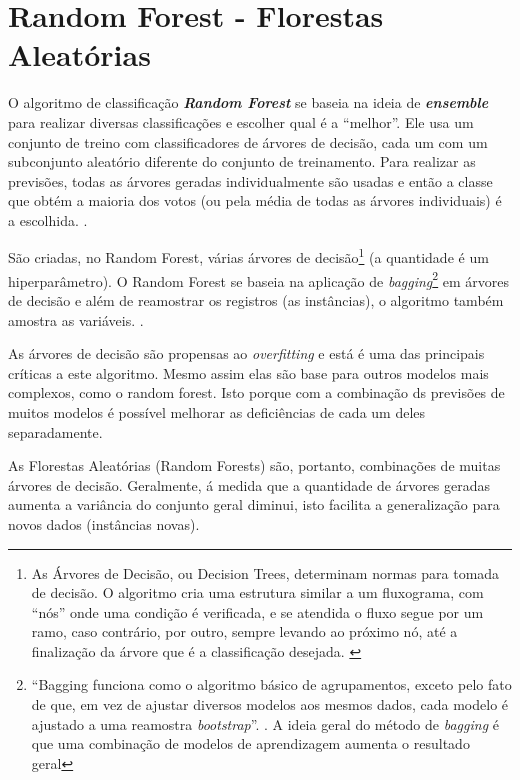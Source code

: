 \section{Random Forest - Florestas Aleatórias}\label{random-forest}
O algoritmo de classificação \textbf{\textit{Random Forest}} se baseia na ideia de \textit{\textbf{ensemble}} para realizar diversas classificações e escolher qual é a ``melhor''. Ele usa um conjunto de treino com classificadores de árvores de decisão, cada um com um subconjunto aleatório diferente do conjunto de treinamento. Para realizar as previsões, todas as árvores geradas individualmente são usadas e então a classe que obtém a maioria dos votos (ou pela média de todas as árvores individuais) é a escolhida. \cite{alpaydin_introduction_2014} \cite{bruce_estatistica_2019} \cite{geron_maos_2020}.

São criadas, no Random Forest, várias árvores de decisão\footnote{As Árvores de Decisão, ou Decision Trees, determinam normas para tomada de decisão. O algoritmo cria uma estrutura similar a um fluxograma, com ``nós'' onde uma condição é verificada, e se atendida o fluxo segue por um ramo, caso contrário, por outro, sempre levando ao próximo nó, até a finalização da árvore que é a classificação desejada. \cite{classification2013}} (a quantidade é um hiperparâmetro). O Random Forest se baseia na aplicação de \textit{bagging}\footnote{``Bagging funciona como o algoritmo básico de agrupamentos, exceto pelo fato de que, em vez de ajustar diversos modelos aos mesmos dados, cada modelo é ajustado a uma reamostra \textit{bootstrap}''. \cite[p.237]{bruce_estatistica_2019}. A ideia geral do método de \textit{bagging} é que uma combinação de modelos de aprendizagem aumenta o resultado geral} em árvores de decisão e além de reamostrar os registros (as instâncias), o algoritmo também amostra as variáveis. \cite[p. 237 e 238]{bruce_estatistica_2019}.

As árvores de decisão são propensas ao \textit{overfitting} e está é uma das principais críticas a este algoritmo. Mesmo assim elas são base para outros modelos mais complexos, como o random forest. Isto porque com a combinação ds previsões de muitos modelos é possível melhorar as deficiências de cada um deles separadamente. 

As Florestas Aleatórias (Random Forests) são, portanto,  combinações de muitas árvores de decisão. Geralmente, á medida que a quantidade de árvores geradas aumenta a variância do conjunto geral diminui, isto facilita a generalização para novos dados (instâncias novas).

